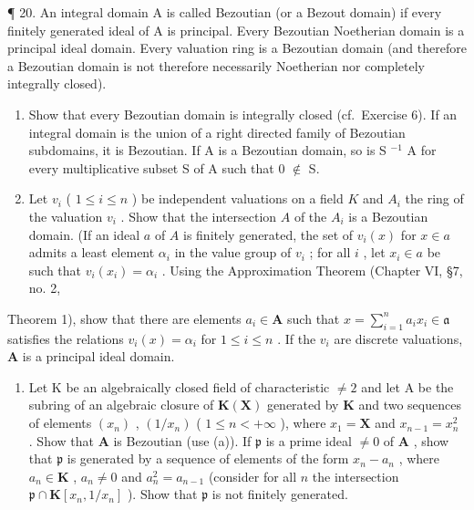 ¶ 20. An integral domain A is called Bezoutian (or a Bezout domain) if every finitely generated ideal of A is principal. Every Bezoutian Noetherian domain is a principal ideal domain. Every valuation ring is a Bezoutian domain (and therefore a Bezoutian domain is not therefore necessarily Noetherian nor completely integrally closed).

\begin{enumerate}
\def\labelenumi{(\alph{enumi})}
\item
  Show that every Bezoutian domain is integrally closed (cf.~Exercise 6). If an integral domain is the union of a right directed family of Bezoutian subdomains, it is Bezoutian. If A is a Bezoutian domain, so is S \(^{-1}\) A for every multiplicative subset S of A such that 0 \(\notin\) S.
\item
  Let \(v_{i}\) ( \(1 \leqslant i \leqslant n\) ) be independent valuations on a field \(K\) and \(A_{i}\) the ring of the valuation \(v_{i}\) . Show that the intersection \(A\) of the \(A_{i}\) is a Bezoutian domain. (If an ideal \(a\) of \(A\) is finitely generated, the set of \(v_{i}(x)\) for \(x \in a\) admits a least element \(\alpha_{i}\) in the value group of \(v_{i}\) ; for all \(i\) , let \(x_{i} \in a\) be such that \(v_{i}(x_{i}) = \alpha_{i}\) . Using the Approximation Theorem (Chapter VI, §7, no. 2,
\end{enumerate}

Theorem 1), show that there are elements \(a_i \in \mathbf{A}\) such that \(x = \sum_{i=1}^{n} a_i x_i \in \mathfrak{a}\) satisfies the relations \(v_i(x) = \alpha_i\) for \(1 \leqslant i \leqslant n\) . If the \(v_i\) are discrete valuations, \(\mathbf{A}\) is a principal ideal domain.

\begin{enumerate}
\def\labelenumi{(\alph{enumi})}
\setcounter{enumi}{2}
\tightlist
\item
  Let K be an algebraically closed field of characteristic \(\neq2\) and let A be the subring of an algebraic closure of \(\mathbf{K}(\mathbf{X})\) generated by \(\mathbf{K}\) and two sequences of elements \((x_{n})\) , \((1 / x_{n})\) ( \(1 \leqslant n < +\infty\) ), where \(x_{1} = \mathbf{X}\) and \(x_{n-1} = x_{n}^{2}\) . Show that \(\mathbf{A}\) is Bezoutian (use (a)). If \(\mathfrak{p}\) is a prime ideal \(\neq 0\) of \(\mathbf{A}\) , show that \(\mathfrak{p}\) is generated by a sequence of elements of the form \(x_{n} - a_{n}\) , where \(a_{n} \in \mathbf{K}\) , \(a_{n} \neq 0\) and \(a_{n}^{2} = a_{n-1}\) (consider for all \(n\) the intersection \(\mathfrak{p} \cap \mathbf{K}[x_{n}, 1 / x_{n}]\) ). Show that \(\mathfrak{p}\) is not finitely generated.
\end{enumerate}


